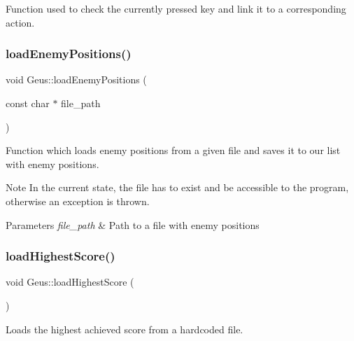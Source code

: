Function used to check the currently pressed key and link it to a corresponding action. 

\mbox{\label{classGeus_a203be0301bb8cf927691e104184a9d1a}} 
\subsubsection{\texorpdfstring{load\+Enemy\+Positions()}{loadEnemyPositions()}}
{\footnotesize\ttfamily void Geus\+::load\+Enemy\+Positions (\begin{DoxyParamCaption}\item[{const char $\ast$}]{file\+\_\+path }\end{DoxyParamCaption})\hspace{0.3cm}{\ttfamily [private]}}

Function which loads enemy positions from a given file and saves it to our list with enemy positions. \begin{DoxyNote}{Note}
In the current state, the file has to exist and be accessible to the program, otherwise an exception is thrown.
\end{DoxyNote}

\begin{DoxyParams}{Parameters}
{\em file\+\_\+path} & Path to a file with enemy positions \\
\hline
\end{DoxyParams}
\mbox{\label{classGeus_a43863016c0866aae15e64994c6f4f45f}} 
\subsubsection{\texorpdfstring{load\+Highest\+Score()}{loadHighestScore()}}
{\footnotesize\ttfamily void Geus\+::load\+Highest\+Score (\begin{DoxyParamCaption}{ }\end{DoxyParamCaption})\hspace{0.3cm}{\ttfamily [private]}}



Loads the highest achieved score from a hardcoded file. 

\mbox{\label{classGeus_a2992ad2cc9b243e28a0f344721ac217d}} 
